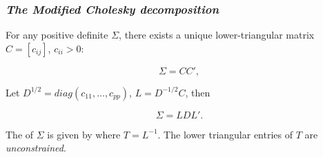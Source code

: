 \begin{frame}
\frametitle{\emph{The Modified Cholesky decomposition}}
For any positive definite $\Sigma$, there exists a unique lower-triangular matrix $C =  \left[c_{ij} \right]$, $c_{ii}> 0$:

\begin{equation*}
\Sigma = CC',
\end{equation*}

Let $D^{1/2} = diag\left( c_{11},\dots, c_{pp} \right)$, $L = D^{-1/2}C$, then 

\begin{equation*}
\Sigma =L D L'. %
\end{equation*}

The  of $\Sigma$ is given by
where {$T = L^{-1}$}. The lower triangular entries of $T$ are \textit{unconstrained}.

\end{frame}





